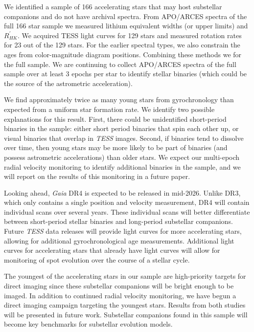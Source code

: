 We identified a sample of 166 accelerating stars that may host substellar companions and do not have archival spectra. From APO/ARCES spectra of the full 166 star sample we measured lithium equivalent widths (or upper limits) and $R^{'}_{HK}$. We acquired TESS light curves for 129 stars and measured rotation rates for 23 out of the 129 stars. For the earlier spectral types, we also constrain the ages from color-magnitude diagram positions. Combining these methods we  for the full sample. We are continuing to collect APO/ARCES spectra of the full sample over at least 3 epochs per star to identify stellar binaries (which could be the source of the astrometric acceleration).

We find approximately twice as many young stars from gyrochronology than expected from a uniform star formation rate. We identify two possible explanations for this result. First, there could be unidentified short-period binaries in the sample: either short period binaries that spin each other up, or visual binaries that overlap in \textit{TESS} images. Second, if binaries tend to dissolve over time, then young stars may be more likely to be part of binaries (and possess astrometric accelerations) than older stars. We expect our multi-epoch radial velocity monitoring to identify additional binaries in the sample, and we will report on the results of this monitoring in a future paper.

Looking ahead, \textit{Gaia} DR4 is expected to be released in mid-2026. Unlike DR3, which only contains a single position and velocity measurement, DR4 will contain individual scans over several years. These individual scans will better differentiate between short-period stellar binaries and long-period substellar companions. Future \textit{TESS} data releases will provide light curves for more accelerating stars, allowing for additional gyrochronological age measurements. Additional light curves for accelerating stars that already have light curves will allow for monitoring of spot evolution over the course of a stellar cycle.

The youngest of the accelerating stars in our sample are high-priority targets for direct imaging since these substellar companions will be bright enough to be imaged. In addition to continued radial velocity monitoring, we have begun a direct imaging campaign targeting the youngest stars. Results from both studies will be presented in future work. Substellar companions found in this sample will become key benchmarks for substellar evolution models.
